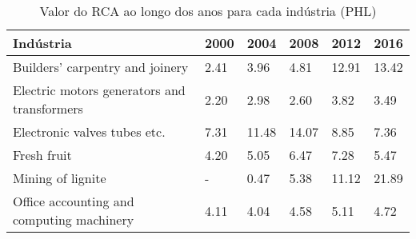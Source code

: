 \begin{table}
\centering
\caption{Valor do RCA ao longo dos anos para cada indústria (PHL)}
\label{tab:ex3-tempo-PHL}
\begin{tabular}{p{6cm}p{1.5cm}p{1.5cm}p{1.5cm}p{1.5cm}p{1.5cm}}
\toprule
                                  Indústria & 2000 &  2004 &  2008 &  2012 &  2016 \\
\midrule
            Builders' carpentry and joinery & 2.41 &  3.96 &  4.81 & 12.91 & 13.42 \\
Electric motors generators and transformers & 2.20 &  2.98 &  2.60 &  3.82 &  3.49 \\
               Electronic valves tubes etc. & 7.31 & 11.48 & 14.07 &  8.85 &  7.36 \\
                                Fresh fruit & 4.20 &  5.05 &  6.47 &  7.28 &  5.47 \\
                          Mining of lignite &    - &  0.47 &  5.38 & 11.12 & 21.89 \\
  Office accounting and computing machinery & 4.11 &  4.04 &  4.58 &  5.11 &  4.72 \\
\bottomrule
\end{tabular}
\end{table}
